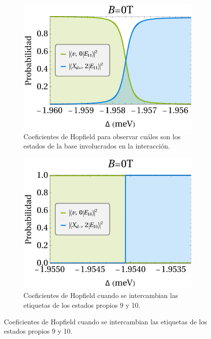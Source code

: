 \documentclass[main.tex]{subfiles}
\begin{document}
\begin{figure}[htbp]
\begin{subfigure}[b]{0.49\textwidth}
		\label{fig:E10E9_B0}
	\end{subfigure}
	\begin{subfigure}[b]{0.49\textwidth}
		\centering
		\includegraphics[width=\textwidth]{res/h11_B0}
		\caption{Coeficientes de Hopfield para observar cuáles son los estados de la base involucrados en la interacción.}
		\label{fig:sh11_B0}
	\end{subfigure}
	\hfill
	\begin{subfigure}[b]{0.49\textwidth}
		\centering
		\includegraphics[width=\textwidth]{res/h10_B0}
		\caption{Coeficientes de Hopfield cuando se intercambian las etiquetas de los estados propios 9 y 10.}
		\label{fig:h10_B0}
	\end{subfigure}

\end{figure}
\end{document}

